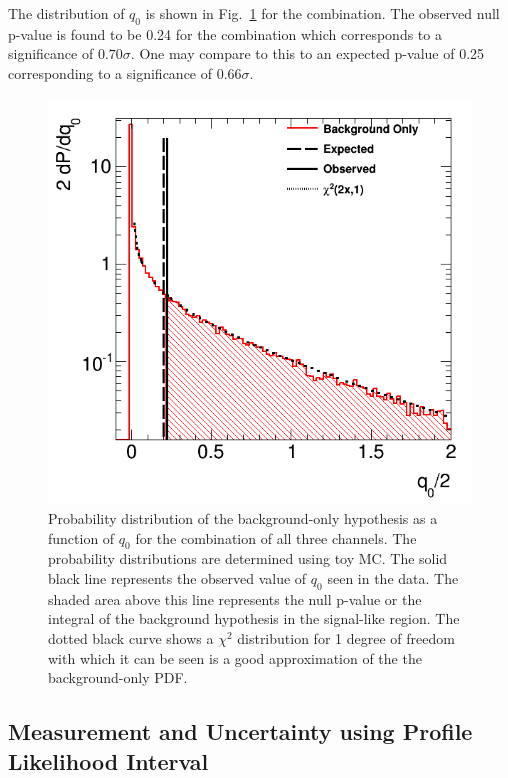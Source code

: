 The distribution of $q_0$ is 
shown in Fig.~\ref{fig:stat_measurement_significance} for the combination.  
The observed null p-value 
is found to be 0.24 for the combination which corresponds to a significance
of $0.70 \sigma$.  One may compare to this to an expected 
p-value of 0.25 corresponding to 
a significance of $0.66 \sigma$.

\begin{figure}[ht!]
\centering
\includegraphics[width=0.50\columnwidth]{figures/statistics/significance/combination.png}
\caption{Probability distribution of the background-only hypothesis as a function of $q_0$ for 
the combination of all three channels. The probability distributions are determined 
using toy MC. The solid black line represents the observed 
value of $q_0$ seen in the data. The shaded area above
this line represents the null p-value or the 
integral of the background hypothesis in the signal-like region.
The dotted black curve shows a $\chi^2$ distribution for 1 degree of 
freedom with which 
it can be seen is a good approximation of the 
the background-only PDF.}
\label{fig:stat_measurement_significance}
\end{figure}


\subsection{Measurement and Uncertainty using Profile Likelihood Interval}

